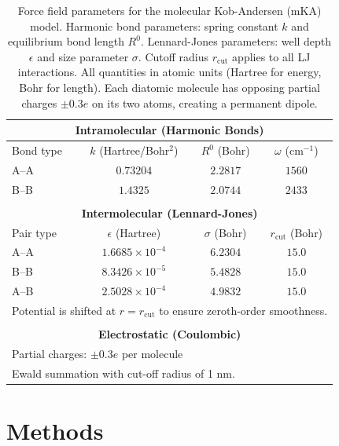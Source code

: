 \documentclass[aps, prl,
 reprint,
 superscriptaddress,
 citeautoscript,
 amsmath,amssymb,
 tightenlines
]{revtex4-2}
\begin{document}
\begin{table}[t]
\centering
\begin{tabular}{lccc}
\toprule
\multicolumn{4}{c}{\textbf{Intramolecular (Harmonic Bonds)}} \\
\midrule
Bond type & $k$ (Hartree/Bohr$^2$) & $R^0$ (Bohr) & $\omega$ (cm$^{-1}$) \\
\midrule
A--A & $0.73204$ & $2.2817$ & $1560$ \\
B--B & $1.4325$ & $2.0744$ & $2433$ \\
\midrule
\multicolumn{4}{c}{} \\
\multicolumn{4}{c}{\textbf{Intermolecular (Lennard-Jones)}} \\
\midrule
Pair type & $\epsilon$ (Hartree) & $\sigma$ (Bohr) & $r_\mathrm{cut}$ (Bohr) \\
\midrule
A--A & $1.6685 \times 10^{-4}$ & $6.2304$ & $15.0$ \\
B--B & $8.3426 \times 10^{-5}$ & $5.4828$ & $15.0$ \\
A--B & $2.5028 \times 10^{-4}$ & $4.9832$ & $15.0$ \\
\multicolumn{4}{l}{Potential is shifted at $r=r_\mathrm{cut}$ to ensure zeroth-order smoothness.} \\
\midrule
\multicolumn{4}{c}{} \\
\multicolumn{4}{c}{\textbf{Electrostatic (Coulombic)}} \\
\midrule
\multicolumn{4}{l}{Partial charges: $\pm 0.3e$ per molecule} \\
\multicolumn{4}{l}{Ewald summation with cut-off radius of 1 nm.} \\
\bottomrule
\end{tabular}
\caption{\label{tab:forcefield}Force field parameters for the molecular Kob-Andersen (mKA) model. Harmonic bond parameters: spring constant $k$ and equilibrium bond length $R^0$. Lennard-Jones parameters: well depth $\epsilon$ and size parameter $\sigma$. Cutoff radius $r_\mathrm{cut}$ applies to all LJ interactions. All quantities in atomic units (Hartree for energy, Bohr for length). Each diatomic molecule has opposing partial charges $\pm 0.3e$ on its two atoms, creating a permanent dipole.}
\end{table}

\section*{Methods}
\end{document}
